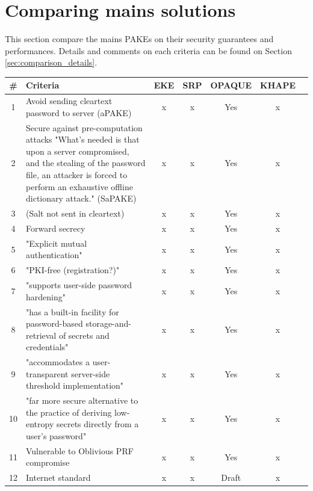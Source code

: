 \documentclass[../report.tex]{subfiles}
\begin{document}
\section{Comparing mains solutions}

This section compare the mains PAKEs on their security guarantees and performances. Details and comments on each criteria can be found on Section \ref{sec:comparison_details}.

\begin{center}
   \begin{tabular}{ | c | p{8cm} || c | c | c | c | c | }
     \hline
     \textbf{\#} & \textbf{Criteria} & \textbf{EKE} & \textbf{SRP} & \textbf{OPAQUE} & \textbf{KHAPE} \\ \hline
     
     
     
     1 & Avoid sending cleartext password to server (aPAKE) & x & x & Yes & x \\ \hline
     
     2 & Secure against pre-computation attacks {"What's needed is that upon a server compromised, and the stealing of the password file, an attacker is forced to perform an exhaustive offline dictionary attack."} (SaPAKE) & x & x & Yes & x \\ \hline
     
     3 & (Salt not sent in cleartext) & x & x & Yes & x \\ \hline
     4 & Forward secrecy & x & x & Yes & x \\ \hline
     5 & "Explicit mutual authentication" & x & x & Yes & x \\ \hline
     6 & "PKI-free (registration?)" & x & x & Yes & x \\ \hline
     7 & "supports user-side password hardening" & x & x & Yes & x \\ \hline
     8 & "has a built-in facility for password-based storage-and-retrieval of secrets and credentials" & x & x & Yes & x \\ \hline
     9 & "accommodates a user-transparent server-side threshold implementation" & x & x & Yes & x \\ \hline
     10 &"far more secure alternative to the practice of deriving low-entropy secrets directly from a user's password" & x & x & Yes & x \\ \hline
     
     11 & Vulnerable to Oblivious PRF compromise & x & x & Yes & x \\ \hline
     12 & Internet standard & x & x & Draft & x \\ \hline
     

\end{tabular}
\end{center}
\end{document}
